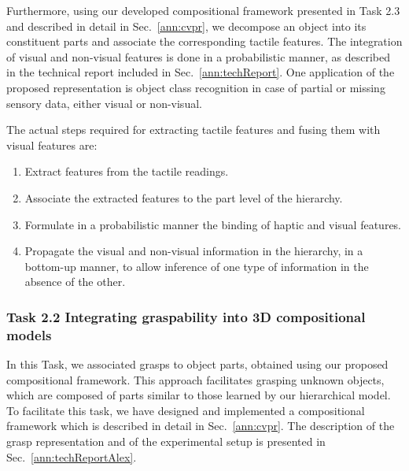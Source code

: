 \documentclass[a4paper,11pt,pdf]{pacmanreport}
\begin{document}
Furthermore, using our developed compositional framework presented in Task 2.3 
and described in detail in Sec.~\ref{ann:cvpr}, we decompose an object into its 
constituent parts and associate the corresponding tactile features. The 
integration of visual and non-visual features is done in a probabilistic manner, 
as described in the technical report included in Sec.~\ref{ann:techReport}. One 
application of the proposed representation is object class recognition in case 
of partial or missing sensory data, either visual or non-visual.

The actual steps required for extracting tactile features and fusing them with 
visual features are:

\begin{enumerate}

\item Extract features from the tactile readings.
\item Associate the extracted features to the part level of the hierarchy.
\item Formulate in a probabilistic manner the binding of haptic and visual features.
\item Propagate the visual and non-visual information in the
  hierarchy, in a bottom-up manner, to allow inference of one type of
  information in the absence of the other.
\end{enumerate}


\subsubsection{Task 2.2 Integrating graspability into 3D compositional models}

In this Task, we associated grasps to object parts, obtained using our proposed 
compositional framework. This approach facilitates grasping unknown objects, 
which are composed of parts similar to those learned by our hierarchical model. 
To facilitate this task, we have designed and implemented a compositional 
framework which is described in detail in Sec.~\ref{ann:cvpr}. The description 
of the grasp representation and of the experimental setup is presented in Sec.~\ref{ann:techReportAlex}.
\end{document}
